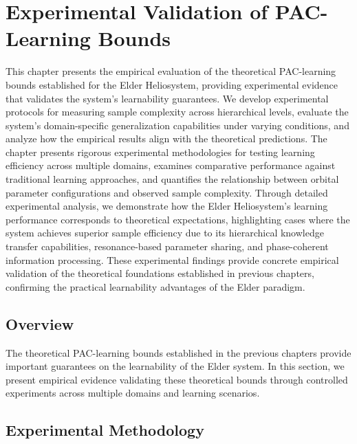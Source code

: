 \chapter{Experimental Validation of PAC-Learning Bounds}

\begin{tcolorbox}[colback=DarkSkyBlue!5!white,colframe=DarkSkyBlue!75!black,title=Chapter Summary]
This chapter presents the empirical evaluation of the theoretical PAC-learning bounds established for the Elder Heliosystem, providing experimental evidence that validates the system's learnability guarantees. We develop experimental protocols for measuring sample complexity across hierarchical levels, evaluate the system's domain-specific generalization capabilities under varying conditions, and analyze how the empirical results align with the theoretical predictions. The chapter presents rigorous experimental methodologies for testing learning efficiency across multiple domains, examines comparative performance against traditional learning approaches, and quantifies the relationship between orbital parameter configurations and observed sample complexity. Through detailed experimental analysis, we demonstrate how the Elder Heliosystem's learning performance corresponds to theoretical expectations, highlighting cases where the system achieves superior sample efficiency due to its hierarchical knowledge transfer capabilities, resonance-based parameter sharing, and phase-coherent information processing. These experimental findings provide concrete empirical validation of the theoretical foundations established in previous chapters, confirming the practical learnability advantages of the Elder paradigm.
\end{tcolorbox}

\section{Overview}

The theoretical PAC-learning bounds established in the previous chapters provide important guarantees on the learnability of the Elder system. In this section, we present empirical evidence validating these theoretical bounds through controlled experiments across multiple domains and learning scenarios.



\section{Experimental Methodology}

